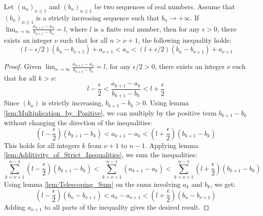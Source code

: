 \begin{lemma}
    \label{lem:Bounding_the_sequence_difference}
    Let $(a_n)_{n\geq 1}$ and $(b_n)_{n\geq 1}$ be two sequences of real numbers. Assume that $(b_n)_{n\geq 1}$ is a strictly increasing sequence such that $b_n \to +\infty$.
    If $\lim_{n\to\infty} \frac{a_{n+1}-a_n}{b_{n+1}-b_n} = l$, where $l$ is a finite real number, then for any $\epsilon > 0$, there exists an integer $\nu$ such that for all $n > \nu+1$, the following inequality holds:
    $$(l - \epsilon/2)(b_n - b_{\nu+1}) + a_{\nu+1} < a_n < (l + \epsilon/2)(b_n - b_{\nu+1}) + a_{\nu+1}$$
\end{lemma}

\begin{proof}
    Given $\lim_{n\to\infty} \frac{a_{n+1}-a_n}{b_{n+1}-b_n} = l$, for any $\epsilon/2 > 0$, there exists an integer $\nu$ such that for all $k > \nu$:
    $$l - \frac{\epsilon}{2} < \frac{a_{k+1}-a_k}{b_{k+1}-b_k} < l + \frac{\epsilon}{2}$$
    Since $(b_n)$ is strictly increasing, $b_{k+1} - b_k > 0$. Using lemma \ref{lem:Multiplication_by_Positive}, we can multiply by the positive term $b_{k+1}-b_k$ without changing the direction of the inequalities:
    $$(l - \frac{\epsilon}{2})(b_{k+1}-b_k) < a_{k+1}-a_k < (l + \frac{\epsilon}{2})(b_{k+1}-b_k)$$
    This holds for all integers $k$ from $\nu+1$ to $n-1$. Applying lemma \ref{lem:Additivity_of_Strict_Inequalities}, we sum the inequalities:
    $$\sum_{k=\nu+1}^{n-1} (l - \frac{\epsilon}{2})(b_{k+1}-b_k) < \sum_{k=\nu+1}^{n-1} (a_{k+1}-a_k) < \sum_{k=\nu+1}^{n-1} (l + \frac{\epsilon}{2})(b_{k+1}-b_k)$$
    Using lemma \ref{lem:Telescoping_Sum} on the sums involving $a_k$ and $b_k$, we get:
    $$(l - \frac{\epsilon}{2})(b_n - b_{\nu+1}) < a_n - a_{\nu+1} < (l + \frac{\epsilon}{2})(b_n - b_{\nu+1})$$
    Adding $a_{\nu+1}$ to all parts of the inequality gives the desired result.
\end{proof}

